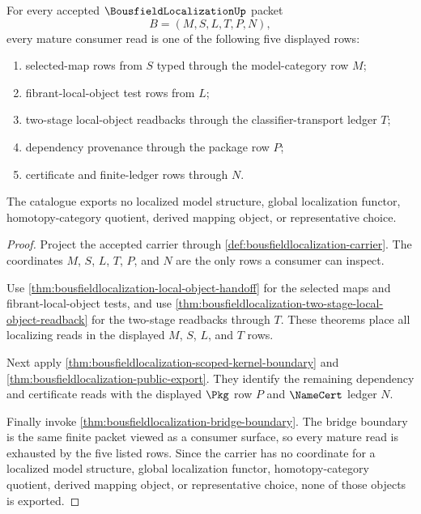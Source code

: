 \begin{theorem}
\label{thm:bousfieldlocalization-mature-consumer-catalogue}
For every accepted $\BousfieldLocalizationUp$ packet
$$
B=(M,S,L,T,P,N),
$$
every mature consumer read is one of the following five displayed rows:
\begin{enumerate}
\item selected-map rows from $S$ typed through the model-category row $M$;
\item fibrant-local-object test rows from $L$;
\item two-stage local-object readbacks through the classifier-transport ledger $T$;
\item dependency provenance through the package row $P$;
\item certificate and finite-ledger rows through $N$.
\end{enumerate}
The catalogue exports no localized model structure, global localization
functor, homotopy-category quotient, derived mapping object, or representative
choice.
\end{theorem}
\begin{proof}
Project the accepted carrier through
\autoref{def:bousfieldlocalization-carrier}. The coordinates $M$, $S$, $L$,
$T$, $P$, and $N$ are the only rows a consumer can inspect.

Use \autoref{thm:bousfieldlocalization-local-object-handoff} for the selected
maps and fibrant-local-object tests, and use
\autoref{thm:bousfieldlocalization-two-stage-local-object-readback} for the
two-stage readbacks through $T$. These theorems place all localizing reads in
the displayed $M$, $S$, $L$, and $T$ rows.

Next apply \autoref{thm:bousfieldlocalization-scoped-kernel-boundary} and
\autoref{thm:bousfieldlocalization-public-export}. They identify the remaining
dependency and certificate reads with the displayed $\Pkg$ row $P$ and
$\NameCert$ ledger $N$.

Finally invoke \autoref{thm:bousfieldlocalization-bridge-boundary}. The bridge
boundary is the same finite packet viewed as a consumer surface, so every
mature read is exhausted by the five listed rows. Since the carrier has no
coordinate for a localized model structure, global localization functor,
homotopy-category quotient, derived mapping object, or representative choice,
none of those objects is exported.
\end{proof}

